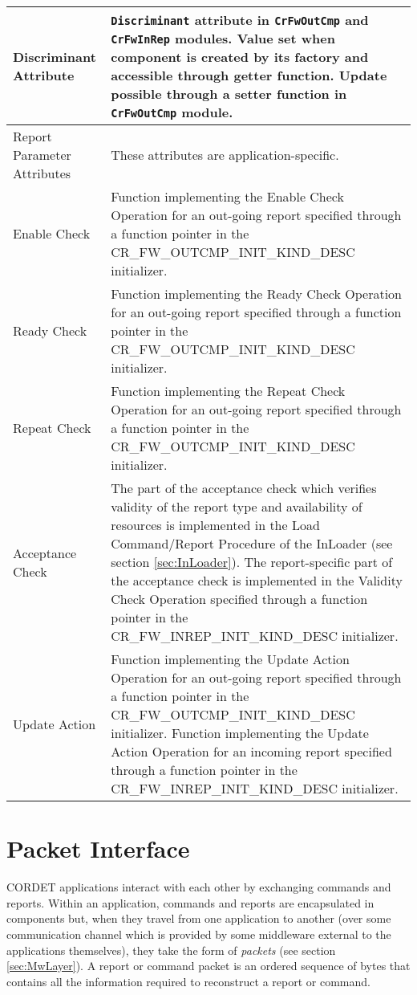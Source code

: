 \documentclass{pnp_article}
\begin{document}
\begin{longtable}{|>{\raggedright}p{2.0cm}|p{11.3cm}|}
\hline
Discriminant Attribute & \texttt{Discriminant} attribute in \texttt{CrFwOutCmp} and \texttt{CrFwInRep} modules. Value set when component is created by its factory and accessible through getter function. Update possible through a setter function in \texttt{CrFwOutCmp} module. \\
\hline
Report Parameter Attributes & These attributes are application-specific.  \\
\hline
Enable Check & Function implementing the Enable Check Operation for an out-going report specified through a function pointer in the CR\_FW\_OUTCMP\_INIT\_KIND\_DESC initializer.  \\
\hline
Ready Check & Function implementing the Ready Check Operation for an out-going report specified through a function pointer in the CR\_FW\_OUTCMP\_INIT\_KIND\_DESC initializer. \\
\hline
Repeat Check & Function implementing the Repeat Check Operation for an out-going report specified through a function pointer in the CR\_FW\_OUTCMP\_INIT\_KIND\_DESC initializer.  \\
\hline
Acceptance Check & The part of the acceptance check which verifies validity of the report type and availability of resources is implemented in the Load Command/Report Procedure of the InLoader (see section \ref{sec:InLoader}). The report-specific part of the acceptance check is implemented in the Validity Check Operation specified through a function pointer in the CR\_FW\_INREP\_INIT\_KIND\_DESC initializer.  \\
\hline
Update Action & Function implementing the Update Action Operation for an out-going report specified through a function pointer in the CR\_FW\_OUTCMP\_INIT\_KIND\_DESC initializer. Function implementing the Update Action Operation for an incoming report specified through a function pointer in the CR\_FW\_INREP\_INIT\_KIND\_DESC initializer. \\
\hline
\end{longtable}




\section{Packet Interface}\label{sec:PcktInterface}
CORDET applications interact with each other by exchanging commands and reports. Within an application, commands and reports are encapsulated in components but, when they travel from one application to another (over some communication channel which is provided by some middleware external to the applications themselves), they take the form of \textit{packets} (see section \ref{sec:MwLayer}). A report or command packet is an ordered sequence of bytes that contains all the information required to reconstruct a report or command. 
\end{document}
